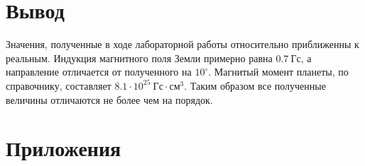\documentclass[14pt, a4paper]{report}
\begin{document}
\section{Вывод}

Значения, полученные в ходе лабораторной работы относительно приближенны к реальным. Индукция магнитного поля Земли примерно равна $0.7\ Гс$, а направление отличается от полученного на $10^\circ$. Магнитый момент планеты, по справочнику, составляет $8.1\cdot10^{25}\ Гс\cdot см^3$. Таким образом все полученные величины отличаются не более чем на порядок.

\section{Приложения}

\begin{table}[h]
\centering
{}
\caption{Измерения периодов колебания крутильного маятника}
\end{table}

\begin{table}[5h]
\centering
{}
\caption{Измерения механического момента сил}
\end{table}
\end{document}

